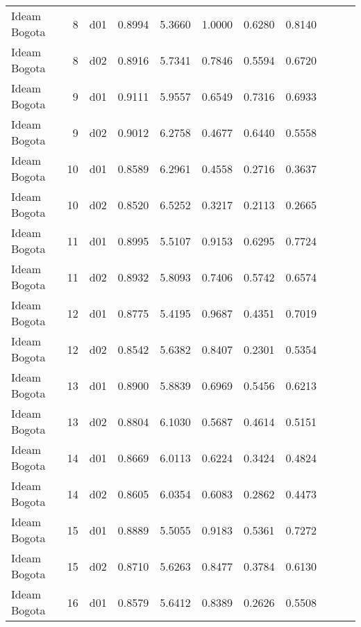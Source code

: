\begin{landscape}
\begin{longtable}{p{2cm}rrrrrrrrrr}
            Ideam Bogota  &          8 &     d01 &   0.8994 &  5.3660 &        1.0000 &           0.6280 &  0.8140 \\
            Ideam Bogota  &          8 &     d02 &   0.8916 &  5.7341 &        0.7846 &           0.5594 &  0.6720 \\
            Ideam Bogota  &          9 &     d01 &   0.9111 &  5.9557 &        0.6549 &           0.7316 &  0.6933 \\
            Ideam Bogota  &          9 &     d02 &   0.9012 &  6.2758 &        0.4677 &           0.6440 &  0.5558 \\
            Ideam Bogota  &         10 &     d01 &   0.8589 &  6.2961 &        0.4558 &           0.2716 &  0.3637 \\
            Ideam Bogota  &         10 &     d02 &   0.8520 &  6.5252 &        0.3217 &           0.2113 &  0.2665 \\
            Ideam Bogota  &         11 &     d01 &   0.8995 &  5.5107 &        0.9153 &           0.6295 &  0.7724 \\
            Ideam Bogota  &         11 &     d02 &   0.8932 &  5.8093 &        0.7406 &           0.5742 &  0.6574 \\
            Ideam Bogota  &         12 &     d01 &   0.8775 &  5.4195 &        0.9687 &           0.4351 &  0.7019 \\
            Ideam Bogota  &         12 &     d02 &   0.8542 &  5.6382 &        0.8407 &           0.2301 &  0.5354 \\
            Ideam Bogota  &         13 &     d01 &   0.8900 &  5.8839 &        0.6969 &           0.5456 &  0.6213 \\
            Ideam Bogota  &         13 &     d02 &   0.8804 &  6.1030 &        0.5687 &           0.4614 &  0.5151 \\
            Ideam Bogota  &         14 &     d01 &   0.8669 &  6.0113 &        0.6224 &           0.3424 &  0.4824 \\
            Ideam Bogota  &         14 &     d02 &   0.8605 &  6.0354 &        0.6083 &           0.2862 &  0.4473 \\
            Ideam Bogota  &         15 &     d01 &   0.8889 &  5.5055 &        0.9183 &           0.5361 &  0.7272 \\
            Ideam Bogota  &         15 &     d02 &   0.8710 &  5.6263 &        0.8477 &           0.3784 &  0.6130 \\
            Ideam Bogota  &         16 &     d01 &   0.8579 &  5.6412 &        0.8389 &           0.2626 &  0.5508 \\

\end{longtable}
\end{landscape}
